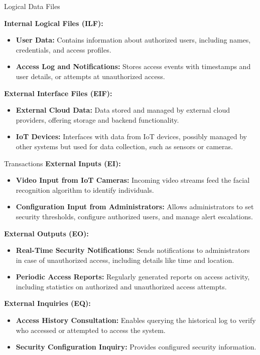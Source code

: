 \documentclass[12pt]{beamer}
\begin{document}
\begin{frame}[allowframebreaks]{Logical Data Files}
\small

\textbf{Internal Logical Files (ILF):}

\begin{itemize}
    \item \textbf{User Data:} Contains information about authorized users, including names, credentials, and access profiles.
    \item \textbf{Access Log and Notifications:} Stores access events with timestamps and user details, or attempts at unauthorized access.
\end{itemize}

\textbf{External Interface Files (EIF):}

\begin{itemize}
    \item \textbf{External Cloud Data:} Data stored and managed by external cloud providers, offering storage and backend functionality.
    \item \textbf{IoT Devices:} Interfaces with data from IoT devices, possibly managed by other systems but used for data collection, such as sensors or cameras.
\end{itemize}
\end{frame}

\begin{frame}[allowframebreaks]{Transactions}
\small
\textbf{External Inputs (EI):}

\begin{itemize}
    \item \textbf{Video Input from IoT Cameras:} Incoming video streams feed the facial recognition algorithm to identify individuals.
    \item \textbf{Configuration Input from Administrators:} Allows administrators to set security thresholds, configure authorized users, and manage alert escalations.
\end{itemize}

\textbf{External Outputs (EO):}

\begin{itemize}
    \item \textbf{Real-Time Security Notifications:} Sends notifications to administrators in case of unauthorized access, including details like time and location.
    \item \textbf{Periodic Access Reports:} Regularly generated reports on access activity, including statistics on authorized and unauthorized access attempts.
\end{itemize}

\textbf{External Inquiries (EQ):}

\begin{itemize}
    \item \textbf{Access History Consultation:} Enables querying the historical log to verify who accessed or attempted to access the system.
    \item \textbf{Security Configuration Inquiry:} Provides configured security information.
\end{itemize}
\end{frame}
\end{document}
